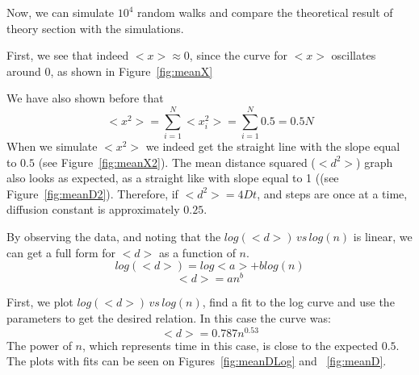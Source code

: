 \documentclass[12pt]{article}
\begin{document}
Now, we can simulate $10^4$ random walks and compare the theoretical result of theory section with the simulations.

First, we see that indeed $<x>\approx 0$, since the curve for $<x>$ oscillates around 0, as shown in Figure~\ref{fig:meanX}

We have also shown before that
\begin{equation}
    <x^2>=\sum_{i=1}^N <x_i^2>=\sum_{i=1}^N 0.5=0.5N
\end{equation}
When we simulate $<x^2>$ we indeed get the straight line with the slope equal to $0.5$ (see Figure~\ref{fig:meanX2}).
The mean distance squared ($<d^2>$) graph also looks as expected, as a straight like with slope equal to 1 ((see Figure~\ref{fig:meanD2}).
Therefore, if $<d^2>=4Dt$, and steps are once at a time, diffusion constant is approximately $0.25$.


By observing the data, and noting that the $log(<d>)\,vs\,log(n)$ is linear, we can get a full form for $<d>$ as a function of $n$.
\begin{equation}
    log(<d>)=log<a>+b log(n)
\end{equation}
\begin{equation}
    <d>=an^b
\end{equation}

 First, we plot $log(<d>)\,vs\,log(n)$, find a fit to the log curve and use the parameters to get the desired relation. In this case the curve was:
\begin{equation}
    <d>=0.787n^{0.53}
\end{equation}
The power of $n$, which represents time in this case, is close to the expected $0.5$. The plots with fits can be seen on Figures~\ref{fig:meanDLog} and ~\ref{fig:meanD}.
\end{document}
